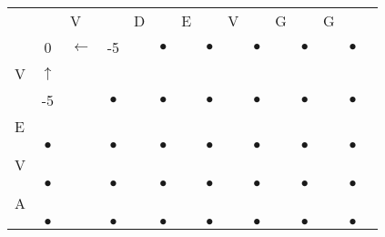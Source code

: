 \documentclass[landscape]{foils}
\begin{document}
\myNewSlide
{
\normalsize
\begin{center}
\begin{tabular}{lclclclclclclcl}
   &              & V             &  & D & & E & & V & & G & & G \\   
   & {\color{black} 0}      & {\color{green}$\leftarrow$}   & -5    &    & {\color{black}$\bullet$} &    & {\color{black}$\bullet$}&    & {\color{black}$\bullet$}&    & {\color{black}$\bullet$}&    & {\color{black}$\bullet$} \\
V  & {\color{green} $\uparrow$} &     & {\color{black} $$ } &     & {\color{black} $$ } & {\color{black} $$} &     & {\color{black} $$ } &     & {\color{black} $$ } & {\color{black} $$} &     & {\color{black} $$ } &       \\
   & -5      &    & {\color{black} $\bullet$}        &    & {\color{black}$\bullet$} &    & {\color{black}$\bullet$}&    & {\color{black}$\bullet$}&    & {\color{black}$\bullet$}&    & {\color{black}$\bullet$} \\
E  & {\color{black} $$} &     & {\color{black} $$ } &     & {\color{black} $$ } & {\color{black} $$} &     & {\color{black} $$ } &     & {\color{black} $$ } & {\color{black} $$} &     & {\color{black} $$ } &       \\   & {\color{black} $\bullet$}      &    & {\color{black} $\bullet$}        &    & {\color{black}$\bullet$} &    & {\color{black}$\bullet$}&    & {\color{black}$\bullet$}&    & {\color{black}$\bullet$}&    & {\color{black}$\bullet$} \\
V  & {\color{black} $$} &     & {\color{black} $$ } &     & {\color{black} $$ } & {\color{black} $$} &     & {\color{black} $$ } &     & {\color{black} $$ } & {\color{black} $$} &     & {\color{black} $$ } &       \\   & {\color{black} $\bullet$}      &    & {\color{black} $\bullet$}        &    & {\color{black}$\bullet$} &    & {\color{black}$\bullet$}&    & {\color{black}$\bullet$}&    & {\color{black}$\bullet$}&    & {\color{black}$\bullet$} \\
A  & {\color{black} $$} &     & {\color{black} $$ } &     & {\color{black} $$ } & {\color{black} $$} &     & {\color{black} $$ } &     & {\color{black} $$ } & {\color{black} $$} &     & {\color{black} $$ } &       \\   & {\color{black} $\bullet$}      &    & {\color{black} $\bullet$}        &    & {\color{black}$\bullet$} &    & {\color{black}$\bullet$}&    & {\color{black}$\bullet$}&    & {\color{black}$\bullet$}&    & {\color{black}$\bullet$} \\

\end{tabular}
\end{center}}
\end{document}
